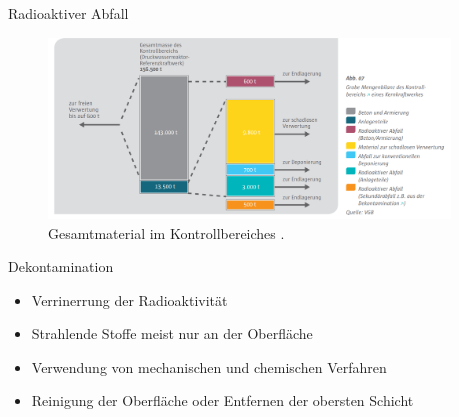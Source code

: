 \begin{frame}{Radioaktiver Abfall}
  \begin{figure}
     \centering
     \includegraphics[width=0.95\textwidth]{./bilder/radioakives_material.PNG}
     \caption{Gesamtmaterial im Kontrollbereiches \cite{muell}. }
     \label{ fig: muell_kontrollbereich}
   \end{figure}
\end{frame}



\begin{frame}{Dekontamination}
  \begin{itemize}
    \setlength\itemsep{1.2em}
    \item{ Verrinerrung der Radioaktivität}
    \item{ Strahlende Stoffe meist nur an der Oberfläche}
    \item{ Verwendung von mechanischen und chemischen Verfahren}
    \item { Reinigung der Oberfläche oder Entfernen der obersten Schicht}
  \end{itemize}
\end{frame}

